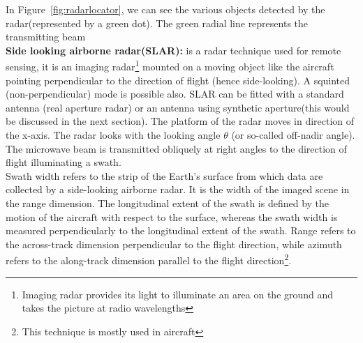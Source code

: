 In Figure~\ref{fig:radarlocator}, we can see the various objects detected by the radar(represented by a green dot). The green radial line represents the transmitting beam\\

\textbf{Side looking airborne radar(SLAR):} is a radar technique used for remote sensing, it is an imaging radar\footnote{Imaging radar provides its light to illuminate an area on the ground and takes the picture at radio wavelengths} mounted on a moving object like the aircraft pointing perpendicular to the direction of flight (hence side-looking). A squinted (non-perpendicular) mode is possible also. SLAR can be fitted with a standard antenna (real aperture radar) or an antenna using synthetic aperture(this would be discussed in the next section). The platform of the radar moves in direction of the x-axis. The radar looks with the looking angle $\theta$ (or so-called off-nadir angle).\\

The microwave beam is transmitted obliquely at right angles to the direction of flight illuminating a swath.\\
Swath width refers to the strip of the Earth's surface from which data are collected by a side-looking airborne radar. It is the width of the imaged scene in the range dimension. The longitudinal extent of the swath is defined by the motion of the aircraft with respect to the surface, whereas the swath width is measured perpendicularly to the longitudinal extent of the swath. Range refers to the across-track dimension perpendicular to the flight direction, while azimuth refers to the along-track dimension parallel to the flight direction\footnote{This technique is mostly used in aircraft}.\\

